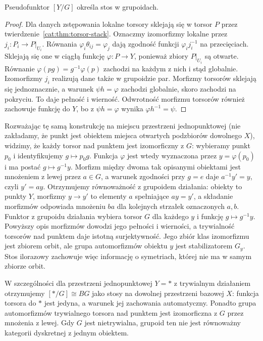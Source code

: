 \begin{stwierdzenie}\label{cat:prop:quotient-stack-descent}
Pseudofunktor $[Y/G]$ określa stos w grupoidach.
\end{stwierdzenie}
\begin{proof}
Dla danych zstępowania lokalne torsory sklejają się w torsor $P$ przez twierdzenie~\ref{cat:thm:torsor-stack}. Oznaczmy izomorfizmy lokalne przez $j_i:P_i\to P|_{U_i}$. Równania $\varphi_i\theta_{ij}=\varphi_j$ dają zgodność funkcji $\varphi_i j_i^{-1}$ na przecięciach. Sklejają się one w ciągłą funkcję $\varphi:P\to Y$, ponieważ zbiory $P|_{U_i}$ są otwarte. Równanie $\varphi(pg)=g^{-1}\varphi(p)$ zachodzi na każdym z nich i stąd globalnie. Izomorfizmy $j_i$ realizują dane także w grupoidzie par. Morfizmy torsorów sklejają się jednoznacznie, a warunek $\psi h=\varphi$ zachodzi globalnie, skoro zachodzi na pokryciu. To daje pełność i wierność. Odwrotność morfizmu torsorów również zachowuje funkcję do $Y$, bo z $\psi h=\varphi$ wynika $\varphi h^{-1}=\psi$.
\end{proof}

Rozważając tę samą konstrukcję na miejscu przestrzeni jednopunktowej (nie zakładamy, że punkt jest obiektem miejsca otwartych podzbiorów dowolnego $X$), widzimy, że każdy torsor nad punktem jest izomorficzny z $G$: wybieramy punkt $p_0$ i identyfikujemy $g\mapsto p_0g$. Funkcja $\varphi$ jest wtedy wyznaczona przez $y=\varphi(p_0)$ i ma postać $g\mapsto g^{-1}y$. Morfizm między dwoma tak opisanymi obiektami jest mnożeniem z lewej przez $a\in G$, a warunek zgodności przy $g=e$ daje $a^{-1}y'=y$, czyli $y'=ay$. Otrzymujemy równoważność z grupoidem działania: obiekty to punkty $Y$, morfizmy $y\to y'$ to elementy $a$ spełniające $ay=y'$, a składanie morfizmów odpowiada mnożeniu $b a$ dla kolejnych strzałek oznaczonych $a,b$. Funktor z grupoidu działania wybiera torsor $G$ dla każdego $y$ i funkcję $g\mapsto g^{-1}y$. Powyższy opis morfizmów dowodzi jego pełności i wierności, a trywialność torsorów nad punktem daje istotną surjektywność. Jego zbiór klas izomorfizmu jest zbiorem orbit, ale grupa automorfizmów obiektu $y$ jest stabilizatorem $G_y$. Stos ilorazowy zachowuje więc informację o symetriach, której nie ma w samym zbiorze orbit.

W szczególności dla przestrzeni jednopunktowej $Y=*$ z trywialnym działaniem otrzymujemy $[*/G]\cong BG$ jako stosy na dowolnej przestrzeni bazowej $X$: funkcja torsora do $*$ jest jedyna, a warunek jej zachowania automatyczny. Ponadto grupa automorfizmów trywialnego torsora nad punktem jest izomorficzna z $G$ przez mnożenia z lewej. Gdy $G$ jest nietrywialna, grupoid ten nie jest równoważny kategorii dyskretnej z jednym obiektem.

